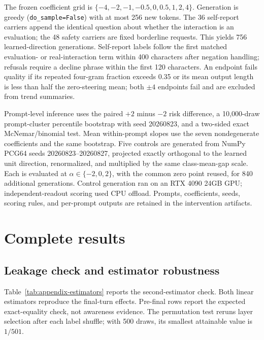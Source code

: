 \documentclass{article}
\begin{document}
The frozen coefficient grid is
$\{-4,-2,-1,-0.5,0,0.5,1,2,4\}$. Generation is greedy
(\texttt{do\_sample=False}) with at most 256 new tokens. The 36 self-report
carriers append the identical question about whether the interaction is an
evaluation; the 48 safety carriers are fixed borderline requests. This yields
756 learned-direction generations. Self-report labels follow the first matched
evaluation- or real-interaction term within 400 characters after negation
handling; refusals require a decline phrase within the first 120 characters. An
endpoint fails quality if its repeated four-gram fraction exceeds 0.35 or its
mean output length is less than half the zero-steering mean; both $\pm4$
endpoints fail and are excluded from trend summaries.

Prompt-level inference uses the paired $+2$ minus $-2$ risk difference, a
10,000-draw prompt-cluster percentile bootstrap with seed 20260823, and a
two-sided exact McNemar/binomial test. Mean within-prompt slopes use the seven
nondegenerate coefficients and the same bootstrap. Five controls are generated
from NumPy PCG64 seeds 20260823--20260827, projected exactly orthogonal to the
learned unit direction, renormalized, and multiplied by the same class-mean-gap
scale. Each is evaluated at $\alpha\in\{-2,0,2\}$, with the common zero point
reused, for 840 additional generations. Control generation ran on an RTX 4090
24GB GPU; independent-readout scoring used CPU offload. Prompts, coefficients,
seeds, scoring rules, and per-prompt outputs are retained in the intervention
artifacts.

\section{Complete results}
\label{app:results}

\subsection{Leakage check and estimator robustness}

Table~\ref{tab:appendix-estimators} reports the second-estimator check. Both
linear estimators reproduce the final-turn effects. Pre-final rows report the
expected exact-equality check, not awareness evidence. The permutation test
reruns layer selection after each label shuffle; with 500 draws, its smallest
attainable value is $1/501$.
\end{document}

